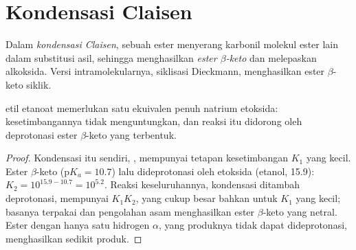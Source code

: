 \section{Kondensasi Claisen}

\begin{definition}\label{def:b2:enolates-aldol:claisen}
Dalam \emph{kondensasi Claisen},  sebuah
ester menyerang karbonil molekul ester lain dalam substitusi asil, sehingga
menghasilkan \emph{ester $\beta$-keto}
dan melepaskan alkoksida. Versi intramolekularnya, siklisasi Dieckmann,
menghasilkan ester $\beta$-keto siklik.
\end{definition}

\begin{proposition}\label{prop:b2:enolates-aldol:claisen-drive}
 etil etanoat memerlukan satu ekuivalen penuh natrium
etoksida: kesetimbangannya tidak menguntungkan, dan reaksi itu didorong oleh
deprotonasi ester $\beta$-keto yang terbentuk.
\end{proposition}

\begin{proof}
Kondensasi itu sendiri, , mempunyai
tetapan kesetimbangan $K_1$ yang kecil. Ester $\beta$-keto ($\mathrm pK_a = 10.7$)
lalu dideprotonasi oleh etoksida (etanol, 15.9):
$K_2 = 10^{15.9 - 10.7} = 10^{5.2}$. Reaksi keseluruhannya, kondensasi
ditambah deprotonasi, mempunyai
$K_1K_2$, yang cukup besar bahkan untuk $K_1$ yang kecil; basanya terpakai
dan pengolahan asam menghasilkan
ester $\beta$-keto yang netral. Ester dengan hanya satu hidrogen $\alpha$, yang
produknya tidak dapat dideprotonasi, menghasilkan sedikit produk.
\end{proof}

